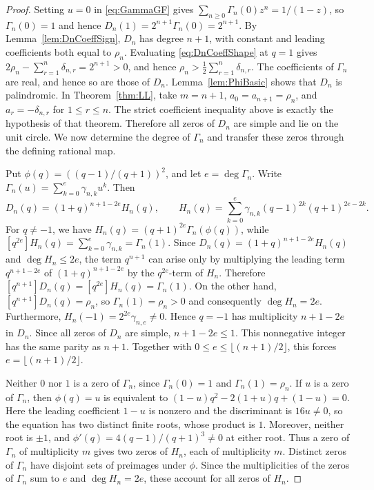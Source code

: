 \documentclass[11pt]{article}
\theoremstyle{plain}
\theoremstyle{remark}
\begin{document}
\begin{proof}
Setting $u=0$ in \eqref{eq:GammaGF} gives
$\sum_{n\ge0}\Gamma_n(0)z^n=1/(1-z)$, so $\Gamma_n(0)=1$ and hence
$D_n(1)=2^{n+1}\Gamma_n(0)=2^{n+1}$.  By
Lemma~\ref{lem:DnCoeffSign}, $D_n$ has degree $n+1$, with constant and
leading coefficients both equal to $\rho_n$.
Evaluating \eqref{eq:DnCoeffShape} at $q=1$ gives
$2\rho_n-\sum_{r=1}^n\delta_{n,r}=2^{n+1}>0$, and hence
$\rho_n>\frac12\sum_{r=1}^n\delta_{n,r}$.  The coefficients of
$\Gamma_n$ are real, and hence so are those of
$D_n$.  Lemma~\ref{lem:PhiBasic} shows that $D_n$ is palindromic.
In Theorem~\ref{thm:LL}, take $m=n+1$,
$a_0=a_{n+1}=\rho_n$, and $a_r=-\delta_{n,r}$ for
$1\le r\le n$.  The strict coefficient inequality above is exactly
the hypothesis of that theorem.  Therefore all zeros of $D_n$ are
simple and lie on the unit circle.  We now determine the degree of
$\Gamma_n$ and transfer these zeros through the defining rational
map.

Put $\phi(q)=((q-1)/(q+1))^2$, and let
$e=\deg\Gamma_n$.  Write
$\Gamma_n(u)=\sum_{k=0}^e\gamma_{n,k}u^k$.  Then
\[
D_n(q)=(1+q)^{n+1-2e}H_n(q),
\qquad
H_n(q)=\sum_{k=0}^e\gamma_{n,k}(q-1)^{2k}(q+1)^{2e-2k}.
\]
For $q\ne-1$, we have
$H_n(q)=(q+1)^{2e}\Gamma_n(\phi(q))$, while
$[q^{2e}]H_n(q)=\sum_{k=0}^e\gamma_{n,k}=\Gamma_n(1)$.  Since
$D_n(q)=(1+q)^{n+1-2e}H_n(q)$ and $\deg H_n\le2e$, the term
$q^{n+1}$ can arise only by multiplying the leading term
$q^{n+1-2e}$ of $(1+q)^{n+1-2e}$ by the $q^{2e}$-term of $H_n$.
Therefore
$[q^{n+1}]D_n(q)=[q^{2e}]H_n(q)=\Gamma_n(1)$.  On the other hand,
$[q^{n+1}]D_n(q)=\rho_n$, so $\Gamma_n(1)=\rho_n>0$ and consequently
$\deg H_n=2e$.
Furthermore,
$H_n(-1)=2^{2e}\gamma_{n,e}\ne0$.  Hence $q=-1$ has multiplicity
$n+1-2e$ in $D_n$.  Since all zeros of $D_n$ are simple,
$n+1-2e\le1$.  This nonnegative integer has the same parity as
$n+1$.  Together with $0\le e\le\lfloor(n+1)/2\rfloor$, this forces
$e=\lfloor(n+1)/2\rfloor$.

Neither $0$ nor $1$ is a zero of $\Gamma_n$, since
$\Gamma_n(0)=1$ and $\Gamma_n(1)=\rho_n$.  If $u$ is a zero of
$\Gamma_n$, then $\phi(q)=u$ is equivalent to
$(1-u)q^2-2(1+u)q+(1-u)=0$.
Here the leading coefficient $1-u$ is nonzero and the discriminant is
$16u\ne0$, so the equation has two distinct finite roots, whose product
is $1$.  Moreover, neither root is $\pm1$, and
$\phi'(q)=4(q-1)/(q+1)^3\ne0$ at either root.  Thus a zero of
$\Gamma_n$ of multiplicity $m$ gives two zeros of $H_n$, each of
multiplicity $m$.  Distinct zeros of $\Gamma_n$ have disjoint sets of
preimages under $\phi$.  Since the multiplicities of the zeros of
$\Gamma_n$ sum to $e$ and $\deg H_n=2e$, these account for all zeros
of $H_n$.


\end{proof}
\end{document}
